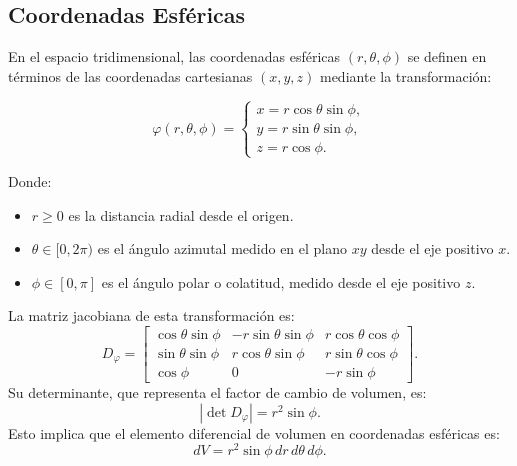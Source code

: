 \subsection{Coordenadas Esféricas}

\begin{definición}
En el espacio tridimensional, las coordenadas esféricas $(r, \theta, \phi)$ se definen en términos de las coordenadas cartesianas $(x, y, z)$ mediante la transformación:\\

\begin{minipage}{0.5\textwidth}
    \[
        \varphi(r, \theta, \phi) =
        \begin{cases}
            x = r\cos\theta \sin\phi, \\
            y = r\sin\theta \sin\phi, \\
            z = r\cos\phi.
        \end{cases}
    \]
\end{minipage}
\begin{minipage}{0.5\textwidth}
    \centering
    
\end{minipage}

Donde:
\begin{itemize}
    \item $r \geq 0$ es la distancia radial desde el origen.
    \item $\theta \in [0, 2\pi)$ es el ángulo azimutal medido en el plano $xy$ desde el eje positivo $x$.
    \item $\phi \in [0, \pi]$ es el ángulo polar o colatitud, medido desde el eje positivo $z$.
\end{itemize}

La matriz jacobiana de esta transformación es: $$ D_\varphi =
    \begin{bmatrix}
        \cos\theta \sin\phi & -r\sin\theta \sin\phi & r\cos\theta \cos\phi \\
        \sin\theta \sin\phi & r\cos\theta \sin\phi  & r\sin\theta \cos\phi \\
        \cos\phi            & 0                     & -r\sin\phi
    \end{bmatrix}.
$$
Su determinante, que representa el factor de cambio de volumen, es:
$$
    \left| \det D_\varphi \right| = r^2 \sin\phi.
$$
Esto implica que el elemento diferencial de volumen en coordenadas esféricas es:
$$
    dV = r^2 \sin\phi \, dr \, d\theta \, d\phi.
$$
\end{definición}

